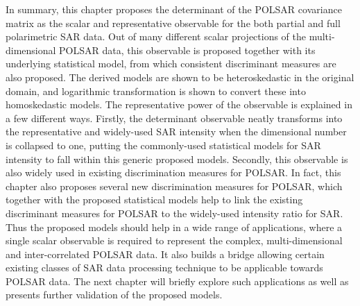 %

In summary, this chapter proposes the determinant of the POLSAR covariance matrix as the scalar and representative observable for the both partial and full polarimetric SAR data.
Out of many different scalar projections of the multi-dimensional POLSAR data, this observable is proposed together with its underlying statistical model, from which consistent discriminant measures are also proposed.
The derived models are shown to be heteroskedastic in the original domain, and logarithmic transformation is shown to convert these into homoskedastic models.
The representative power of the observable is explained in a few different ways.
Firstly, the determinant observable neatly transforms into the representative and widely-used SAR intensity when the dimensional number is collapsed to one, putting the commonly-used statistical models for SAR intensity to fall within this generic proposed models.
Secondly, this observable is also  widely used in existing discrimination measures for POLSAR.
In fact, this chapter also proposes several new discrimination measures for POLSAR,
  which together with the proposed statistical models help to link the existing discriminant measures for POLSAR to the widely-used intensity ratio for SAR.
Thus the proposed models should help in a wide range of applications, where a single scalar observable is required to represent the complex, multi-dimensional and inter-correlated POLSAR data.
It also builds a bridge allowing  certain existing classes of SAR data processing technique to be applicable towards POLSAR data.
The next chapter will briefly explore such applications as well as presents further validation of the proposed models.
                
